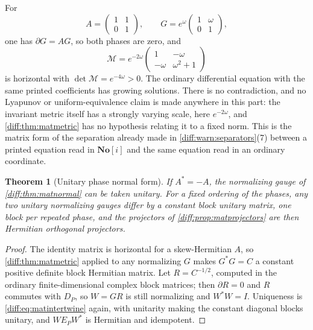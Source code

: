 \documentclass[11pt,letterpaper]{article}
\numberwithin{equation}{section}
\newtheorem{theorem}{Theorem}[section]
\theoremstyle{definition}
\theoremstyle{remark}
\newcommand{\SC}{\mathbf{No}[i]}
\newcommand{\der}{\partial}
\begin{document}
\begin{warning}
\label{diff:warn:matlyapunov}
For
\[
 A=\begin{pmatrix}1&1\\0&1\end{pmatrix},
 \qquad
 G=e^{\omega}\begin{pmatrix}1&\omega\\0&1\end{pmatrix},
\]
one has $\der G=AG$, so both phases are zero, and
\[
 \mathcal M=e^{-2\omega}
 \begin{pmatrix}1&-\omega\\-\omega&\omega^{2}+1\end{pmatrix}
\]
is horizontal with $\det\mathcal M=e^{-4\omega}>0$. The ordinary differential
equation with the same printed coefficients has growing solutions. There is no
contradiction, and no Lyapunov or uniform-equivalence claim is made anywhere
in this part: the invariant metric itself has a strongly varying scale, here
$e^{-2\omega}$, and \cref{diff:thm:matmetric} has no hypothesis relating it to
a fixed norm. This is the matrix form of the separation already made in
\cref{diff:warn:separators}(7) between a printed equation read in $\SC$ and the
same equation read in an ordinary coordinate.
\end{warning}

\begin{theorem}[Unitary phase normal form]
\label{diff:thm:matunitary}
If $A^{*}=-A$, the normalizing gauge of \cref{diff:thm:matnormal} can be taken
unitary. For a fixed ordering of the phases, any two unitary normalizing
gauges differ by a constant block unitary matrix, one block per repeated
phase, and the projectors of \cref{diff:prop:matprojectors} are then Hermitian
orthogonal projectors.
\end{theorem}
\begin{proof}
The identity matrix is horizontal for a skew-Hermitian $A$, so
\cref{diff:thm:matmetric} applied to any normalizing $G$ makes
$G^{*}G=C$ a constant positive definite block Hermitian matrix. Let
$R=C^{-1/2}$, computed in the ordinary finite-dimensional complex block
matrices; then $\der R=0$ and $R$ commutes with $D_{P}$, so $W=GR$ is still
normalizing and $W^{*}W=I$. Uniqueness is \cref{diff:eq:matintertwine} again,
with unitarity making the constant diagonal blocks unitary, and
$WE_{P}W^{*}$ is Hermitian and idempotent.
\end{proof}
\end{document}
